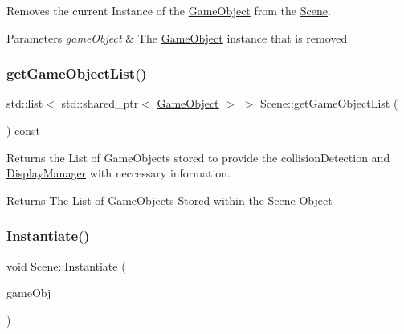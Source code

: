 Removes the current Instance of the \hyperlink{class_game_object}{Game\+Object} from the \hyperlink{class_scene}{Scene}. 


\begin{DoxyParams}{Parameters}
{\em game\+Object} & The \hyperlink{class_game_object}{Game\+Object} instance that is removed \\
\hline
\end{DoxyParams}
\mbox{\label{class_scene_a717b5fcf248038c51b205b022301318f}} 
\subsubsection{\texorpdfstring{get\+Game\+Object\+List()}{getGameObjectList()}}
{\footnotesize\ttfamily std\+::list$<$ std\+::shared\+\_\+ptr$<$ \hyperlink{class_game_object}{Game\+Object} $>$ $>$ Scene\+::get\+Game\+Object\+List (\begin{DoxyParamCaption}{ }\end{DoxyParamCaption}) const}



Returns the List of Game\+Objects stored to provide the collision\+Detection and \hyperlink{class_display_manager}{Display\+Manager} with neccessary information. 

\begin{DoxyReturn}{Returns}
The List of Game\+Objects Stored within the \hyperlink{class_scene}{Scene} Object 
\end{DoxyReturn}
\mbox{\label{class_scene_a3dd730cba4a22bf75e54c4b644c26976}} 
\subsubsection{\texorpdfstring{Instantiate()}{Instantiate()}}
{\footnotesize\ttfamily void Scene\+::\+Instantiate (\begin{DoxyParamCaption}\item[{shared\+\_\+ptr$<$ \hyperlink{class_game_object}{Game\+Object} $>$}]{game\+Obj }\end{DoxyParamCaption})\hspace{0.3cm}{\ttfamily [virtual]}}



